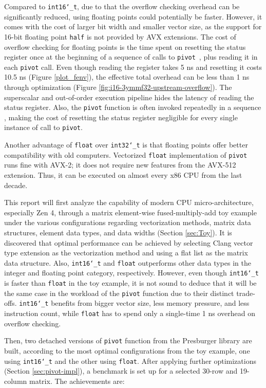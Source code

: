 \documentclass[logo,bsc,singlespacing,parskip]{infthesis}
\newcommand{\dtshort}{\texttt{int16\char`_t}}
\newcommand{\dtint}{\texttt{int32\char`_t}}
\newcommand{\dtfloat}{\texttt{float}}
\newcommand{\pivot}{\texttt{pivot}}
\begin{document}
Compared to \dtshort{}, due to that the overflow checking overhead can be significantly reduced, using floating points could potentially be faster. However, it comes with the cost of larger bit width and smaller vector size, as the support for 16-bit floating point \texttt{half} is not provided by AVX extensions. The cost of overflow checking for floating points is the time spent on resetting the status register once at the beginning of a sequence of calls to \pivot{}~\cite{FPL1}, plus reading it in each \pivot{} call. Even though reading the register takes 5 ns and resetting it costs 10.5 ns (Figure \ref{plot_fenv}), the effective total overhead can be less than 1 ns through optimization (Figure \ref{fig:i16-3ymmf32-upstream-overflow}). The superscalar and out-of-order execution pipeline hides the latency of reading the status register. Also, the \pivot{} function is often invoked repeatedly in a sequence \cite{FPL1}, making the cost of resetting the status register negligible for every single instance of call to \pivot{}. 



Another advantage of \dtfloat{} over \dtint{} is that floating points offer better compatibility with old computers. Vectorized \dtfloat{} implementation of \pivot{} runs fine with AVX-2; it does not require new features from the AVX-512 extension. Thus, it can be executed on almost every x86 CPU from the last decade. 


This report will first analyze the capability of modern CPU micro-architecture, especially Zen 4, through a matrix element-wise fused-multiply-add toy example under the various configurations regarding vectorization methods, matrix data structures, element data types, and data widths (Section \ref{sec:Toy}). It is discovered that optimal performance can be achieved by selecting Clang vector type extension as the vectorization method and using a flat list as the matrix data structure. Also, \dtshort{} and \dtfloat{} outperforms other data types in the integer and floating point category, respectively. However, even though \dtshort{} is faster than \dtfloat{} in the toy example, it is not sound to deduce that it will be the same case in the workload of the \pivot{} function due to their distinct trade-offs. \dtshort{} benefits from bigger vector size, less memory pressure, and less instruction count, while \dtfloat{} has to spend only a single-time 1 ns overhead on overflow checking. 

Then, two detached versions of \texttt{pivot} function from the Presburger library are built, according to the most optimal configurations from the toy example, one using \dtshort{} and the other using \dtfloat{}. After applying further optimizations (Section \ref{sec:pivot-impl}), a benchmark is set up for a selected 30-row and 19-column matrix. The achievements are: 
\end{document}
